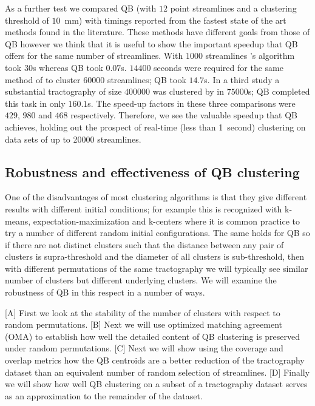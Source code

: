 \documentclass{bioinfo}
\begin{document}
As a further test we compared QB (with $12$ point streamlines and a
clustering threshold of $10$~mm) with timings reported from the fastest
state of the art methods found in the literature. These methods have
different goals from those of QB however we think that it is useful to
show the important speedup that QB offers for the same number of
streamlines. With $\num{1000}$ streamlines
\citet{wang2010tractography}'s algorithm took $30$s whereas QB took
$0.07$s.  $\num{14400}$ seconds were required for the same method of to
cluster $\num{60000}$ streamlines; QB took $14.7$s.  In a third study a
substantial tractography of size $\num{400000}$ was clustered by
\citet{Visser2010} in $\num{75000}$s; QB completed this task in only
$160.1$s. The speed-up factors in these three comparisons were $429$,
$980$ and $468$ respectively. Therefore, we see the valuable speedup
that QB achieves, holding out the prospect of real-time (less than
1~second) clustering on data sets of up to \num{20000} streamlines.

\subsection{Robustness and effectiveness of QB  clustering\label{sub:Comparisons}}


One of the disadvantages of most clustering algorithms is that they give
different results with different initial conditions; for example this is
recognized with k-means, expectation-maximization
\citep{dempster1977maximum} and k-centers \citep{gonzalez1985clustering}
where it is common practice to try a number of different random initial
configurations. The same holds for QB so if there are not distinct
clusters such that the distance between any pair of clusters is
supra-threshold and the diameter of all clusters is sub-threshold, then
with different permutations of the same tractography we will typically
see similar number of clusters but different underlying clusters. We
will examine the robustness of QB in this respect in a number of ways.

[A] First we look at the stability of the number of clusters with
respect to random permutations. [B] Next we will use optimized matching
agreement (OMA) to establish how well the detailed content of QB
clustering is preserved under random permutations. [C] Next we will show
using the coverage and overlap metrics how the QB centroids are a better
reduction of the tractography dataset than an equivalent number of
random selection of streamlines. [D] Finally we will show how well QB
clustering on a subset of a tractography dataset serves as an
approximation to the remainder of the dataset.
\end{document}
